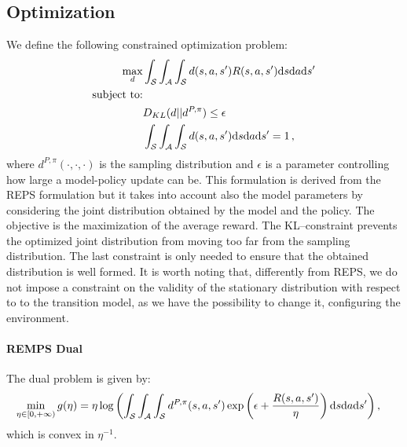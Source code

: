 \subsection{Optimization}
 We define the following constrained optimization problem:
\begin{align}
	\max_{d} & \int_\mathcal{S} \int_\mathcal{A} \int_\mathcal{S} d(s,a,s')	R(s,a,s') \mathrm{d}s \mathrm{d}a \mathrm{d}s' \\
	\text{subject to:} &\\
	& D_{KL}(d || d^{P,\pi}) 
	\leq \epsilon \\
	& \int_\mathcal{S} \int_\mathcal{A} \int_\mathcal{S} d(s,a,s') \mathrm{d}s \mathrm{d}a \mathrm{d}s' = 1 \, ,
	\label{eq:remps}
\end{align}
where $d^{P,\pi}(\cdot, \cdot, \cdot)$ is the sampling distribution and $\epsilon$ is a parameter controlling how large a model-policy update can be. \newline
This formulation is derived from the REPS formulation but it takes into account also the model parameters by considering the joint distribution obtained by the model and the policy. The objective is the maximization of the average reward.
The KL--constraint prevents the optimized joint distribution from moving too far from the sampling distribution. The last constraint is only needed to ensure that the obtained distribution is well formed. It is worth noting that, differently from REPS, we do not impose a constraint on the validity of the stationary distribution with respect to to the transition model, as we have the possibility to change it, configuring the environment. 
\paragraph{REMPS Dual}
The dual problem is given by:
\begin{align}
	\min_{\eta \in [0,+\infty)} g(\eta) &= \eta \log \left( \int_\mathcal{S} \int_\mathcal{A} \int_\mathcal{S} d^{P,\pi}(s,a,s') \exp \left(\epsilon + \frac{R(s,a,s')}{\eta} \right)\mathrm{d}s \mathrm{d}a \mathrm{d}s' \right) ,	
	\label{eq:remps-dual}
\end{align}
which is convex in $\eta^{-1}$.

